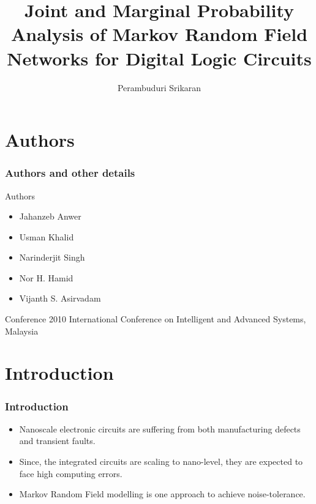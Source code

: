 \documentclass{beamer}
\title{Joint and Marginal Probability Analysis of Markov Random Field Networks for Digital Logic Circuits}
\author{Perambuduri Srikaran}
\institute{IITH AI}
\begin{document}
\providecommand{\pr}[1]{\ensuremath{\Pr\left(#1\right)}}
\providecommand{\qfunc}[1]{\ensuremath{Q\left(#1\right)}}
\providecommand{\sbrak}[1]{\ensuremath{{}\left[#1\right]}}
\providecommand{\lsbrak}[1]{\ensuremath{{}\left[#1\right.}}
\providecommand{\rsbrak}[1]{\ensuremath{{}\left.#1\right]}}
\providecommand{\brak}[1]{\ensuremath{\left(#1\right)}}
\providecommand{\lbrak}[1]{\ensuremath{\left(#1\right.}}
\providecommand{\rbrak}[1]{\ensuremath{\left.#1\right)}}
\providecommand{\cbrak}[1]{\ensuremath{\left\{#1\right\}}}
\providecommand{\lcbrak}[1]{\ensuremath{\left\{#1\right.}}
\providecommand{\rcbrak}[1]{\ensuremath{\left.#1\right\}}}
\providecommand{\brak}[1]{\ensuremath{\left(#1\right)}}
\begin{frame}
\titlepage
\end{frame}
\section{Authors}
\begin{frame}
\frametitle{Authors and other details}
\begin{block}{Authors}
\begin{itemize}
    \item Jahanzeb Anwer
    \item Usman Khalid
    \item Narinderjit Singh
    \item Nor H. Hamid
    \item Vijanth S. Asirvadam
\end{itemize}
\end{block}
\begin{block}{Conference}
2010 International Conference on Intelligent and Advanced Systems, Malaysia
\end{block}
\end{frame}
\section{Introduction}
\begin{frame}
\frametitle{Introduction}
\begin{flushleft}
\begin{itemize}
    \item Nanoscale electronic circuits are suffering from both manufacturing defects and transient faults.
    \item Since, the integrated circuits are scaling to nano-level, they are expected to face high computing errors.
    \item Markov Random Field modelling is one approach to achieve noise-tolerance.
\end{itemize}
\end{flushleft}
\end{frame}
\end{document}
